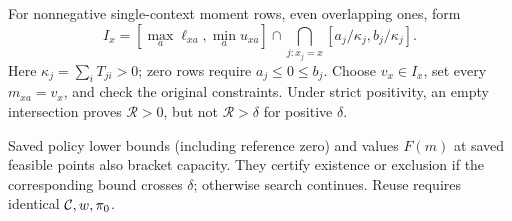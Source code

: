 For nonnegative single-context moment rows, even overlapping ones, form
\[
 I_x=[\max_a\ell_{xa},\min_a u_{xa}]
       \cap\!\bigcap_{j:x_j=x}[a_j/\kappa_j,b_j/\kappa_j].
\]
Here $\kappa_j=\sum_iT_{ji}>0$; zero rows require $a_j\le0\le b_j$.
Choose $v_x\in I_x$, set every $m_{xa}=v_x$, and check the original constraints. Under strict positivity, an empty intersection proves $\mathcal R>0$, but not $\mathcal R>\delta$ for positive $\delta$.

Saved policy lower bounds (including reference zero) and values $F(m)$ at saved feasible points also bracket capacity. They certify existence or exclusion if the corresponding bound crosses $\delta$; otherwise search continues. Reuse requires identical $\mathcal{C},w,\pi_0$. 
